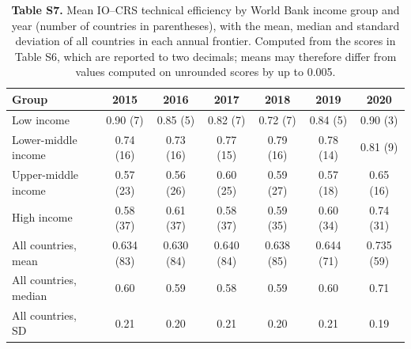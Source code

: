 \documentclass[11pt,letterpaper]{article}
\begin{document}
\clearpage
\begin{table}[htbp]
\footnotesize
\caption{\textbf{Table S7.} Mean IO--CRS technical efficiency by World Bank income group and year (number of countries in parentheses), with the mean, median and standard deviation of all countries in each annual frontier. Computed from the scores in Table S6, which are reported to two decimals; means may therefore differ from values computed on unrounded scores by up to 0.005.}
\begin{tabular}{@{}lcccccc@{}}
\toprule
\textbf{Group} & \textbf{2015} & \textbf{2016} & \textbf{2017} & \textbf{2018} & \textbf{2019} & \textbf{2020} \\
\midrule
Low income & 0.90 (7) & 0.85 (5) & 0.82 (7) & 0.72 (7) & 0.84 (5) & 0.90 (3) \\
Lower-middle income & 0.74 (16) & 0.73 (16) & 0.77 (15) & 0.79 (16) & 0.78 (14) & 0.81 (9) \\
Upper-middle income & 0.57 (23) & 0.56 (26) & 0.60 (25) & 0.59 (27) & 0.57 (18) & 0.65 (16) \\
High income & 0.58 (37) & 0.61 (37) & 0.58 (37) & 0.59 (35) & 0.60 (34) & 0.74 (31) \\
\midrule
All countries, mean & 0.634 (83) & 0.630 (84) & 0.640 (84) & 0.638 (85) & 0.644 (71) & 0.735 (59) \\
All countries, median & 0.60 & 0.59 & 0.58 & 0.59 & 0.60 & 0.71 \\
All countries, SD & 0.21 & 0.20 & 0.21 & 0.20 & 0.21 & 0.19 \\
\bottomrule
\end{tabular}
\end{table}
\end{document}

